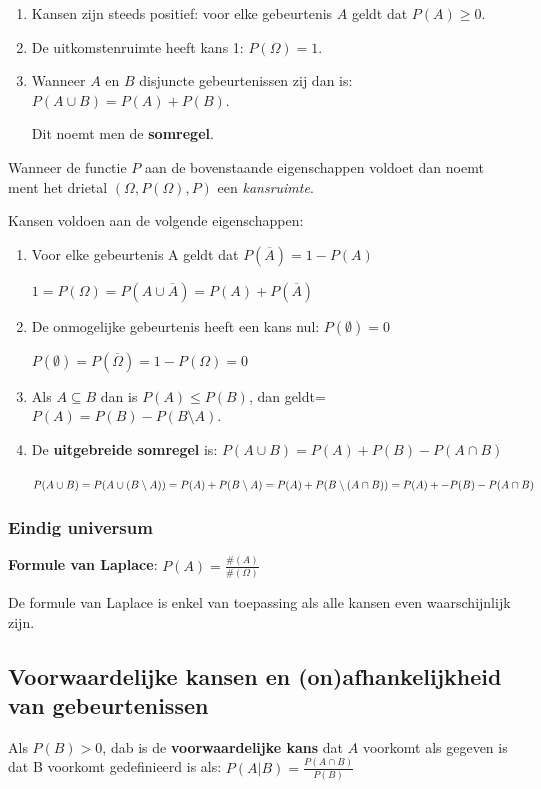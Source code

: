 \documentclass[a4paper,12pt]{article}
\begin{document}
\begin{enumerate}
\item Kansen zijn steeds positief: voor elke gebeurtenis $A$ geldt dat $P(A) \geq 0$.
\item De uitkomstenruimte heeft kans 1: $P(\Omega)=1$.
\item Wanneer $A$ en $B$ disjuncte gebeurtenissen zij dan is: $P(A\cup B)=P(A)+P(B)$.

Dit noemt men de \textbf{somregel}.
\end{enumerate}

Wanneer de functie $P$ aan de bovenstaande eigenschappen voldoet dan noemt ment het drietal $(\Omega, P(\Omega), P)$ een \textit{kansruimte}.

Kansen voldoen aan de volgende eigenschappen:
\begin{enumerate}
\item Voor elke gebeurtenis A geldt dat $P(\overline{A}) = 1-P(A)$

$1 = P(\Omega) = P(A\cup \overline{A}) = P(A) + P(\overline{A})$
\item De onmogelijke gebeurtenis heeft een kans nul: $P(\emptyset)=0$

$P(\emptyset)= P(\overline{\Omega}) = 1 - P(\Omega) = 0$
\item Als $A \subseteq B$ dan is $P(A)\leq P(B)$, dan geldt= $P(A) = P(B) - P(B\setminus A)$.
\item De \textbf{uitgebreide somregel} is: $P(A \cup B) = P(A) + P(B) - P(A \cap B)$

$P(A\cup B) = P(A \cup (B\setminus A))\\
= P(A) + P(B\setminus A)\\
= P(A) + P(B\setminus (A \cap B))\\
= P(A) +- P(B) - P(A \cap B)$
\end{enumerate}
\subsubsection{Eindig universum}
\textbf{Formule van Laplace}: $P(A)=\frac{\#(A)}{\#(\Omega)}$

De formule van Laplace is enkel van toepassing als alle kansen even waarschijnlijk zijn.

\subsection{Voorwaardelijke kansen en (on)afhankelijkheid van gebeurtenissen}
Als $P(B)>0$, dab is de \textbf{voorwaardelijke kans} dat $A$ voorkomt als gegeven is dat B voorkomt gedefinieerd is als:
$P(A|B)=\frac{P(A\cap B)}{P(B)}$
\end{document}
